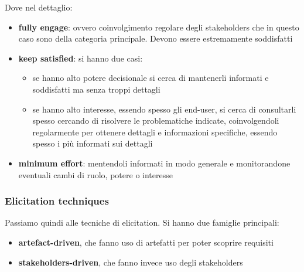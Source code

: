 \documentclass[a4paper,12pt, oneside]{book}
\begin{document}
Dove nel dettaglio:
\begin{itemize}
  \item \textbf{fully engage}: ovvero coinvolgimento regolare degli stakeholders
  che in questo caso sono della categoria principale. Devono essere
  estremamente soddisfatti
  \item \textbf{keep satisfied}: si hanno due casi:
  \begin{itemize}
    \item se hanno alto potere decisionale si cerca di mantenerli informati e
    soddisfatti ma senza troppi dettagli
    \item se hanno alto interesse, essendo spesso gli end-user, si cerca di
    consultarli spesso cercando di risolvere le problematiche indicate,
    coinvolgendoli regolarmente per ottenere dettagli e informazioni specifiche,
    essendo spesso i più informati sui dettagli
  \end{itemize}
  \item \textbf{minimum effort}: mentendoli informati in modo generale e
  monitorandone eventuali cambi di ruolo, potere o interesse
\end{itemize}
\subsubsection{Elicitation techniques}
Passiamo quindi alle tecniche di elicitation. Si hanno due famiglie principali:
\begin{itemize}
  \item \textbf{artefact-driven}, che fanno uso di artefatti per poter scoprire
  requisiti
  \item \textbf{stakeholders-driven}, che fanno invece uso degli stakeholders
\end{itemize}
\end{document}
